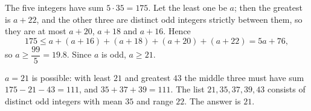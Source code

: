 The five integers have sum $5\cdot35=175$. Let the least one be $a$; then the greatest is $a+22$, and the other three are distinct odd integers strictly between them, so they are at most $a+20$, $a+18$ and $a+16$. Hence
\[
175\le a+(a+16)+(a+18)+(a+20)+(a+22)=5a+76,
\]
so $a\ge\dfrac{99}{5}=19.8$. Since $a$ is odd, $a\ge21$.

$a=21$ is possible: with least $21$ and greatest $43$ the middle three must have sum $175-21-43=111$, and $35+37+39=111$. The list $21,35,37,39,43$ consists of distinct odd integers with mean $35$ and range $22$. The answer is $\boxed{21}$.

